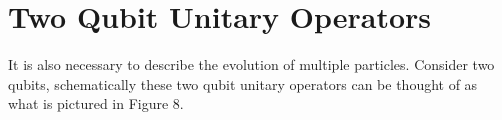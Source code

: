 \documentclass[twocolumn]{article}
\begin{document}
\section*{Two Qubit Unitary Operators}
It is also necessary to describe the evolution of multiple particles. Consider two qubits, schematically these two qubit unitary operators can be thought of as what is pictured in Figure 8.
\begin{figure}[ht]
    \centering
    \newcommand{\figeightcircarad}{0.25}
    \newcommand{\figeightcircaycent}{0.50}
    \newcommand{\figeightlineaxstart}{2*\figeightcircarad}
    \newcommand{\figeightlineaxend}{\figeightlineaxstart+1.25}
    \newcommand{\figeightlineay}{\figeightcircaycent}
    \newcommand{\figeightrectawidth}{1.0}
    \newcommand{\figeightrectaheight}{2*\figeightcircarad}
    \newcommand{\figeightrectax}{\figeightlineaxend}
    \newcommand{\figeightrectay}{0.5*\figeightrectaheight}
    \newcommand{\figeightlinebxstart}{\figeightlineaxend+\figeightrectawidth}
    \newcommand{\figeightlinebxend}{\figeightlinebxstart+1.25}
    \newcommand{\figeightlineby}{\figeightlineay}
    \newcommand{\figeightcircbrad}{0.25}
    \newcommand{\figeightcircbycent}{-0.50}
    \newcommand{\figeightlinecxstart}{2*\figeightcircbrad}
    \newcommand{\figeightlinecxend}{\figeightlinecxstart+1.25}
    \newcommand{\figeightlinecy}{\figeightcircbycent}
    \newcommand{\figeightrectbwidth}{1.0}
    \newcommand{\figeightrectbheight}{2*\figeightcircbrad}
    \newcommand{\figeightrectbx}{\figeightlinecxend}
    \newcommand{\figeightrectby}{-1.5*\figeightrectbheight}
    \newcommand{\figeightlinedxstart}{\figeightlinecxend+\figeightrectbwidth}
    \newcommand{\figeightlinedxend}{\figeightlinedxstart+1.25}
    \newcommand{\figeightlinedy}{\figeightlinecy}
\end{figure}
\end{document}
